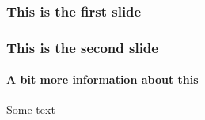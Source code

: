 \documentclass{beamer}
\begin{document}
  \begin{frame}
    \frametitle{This is the first slide}
  \end{frame}
  \begin{frame}
    \frametitle{This is the second slide}
    \framesubtitle{A bit more information about this}
    Some text
  \end{frame}
\end{document}
